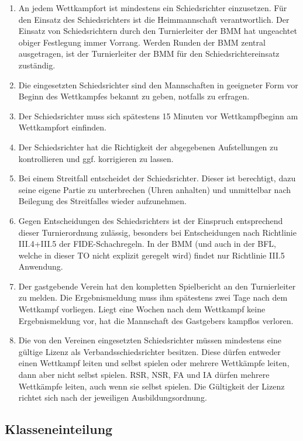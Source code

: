 \documentclass[fontsize=12pt, paper=a4, ngerman]{article}
\begin{document}
\begin{enumerate}
\item An jedem Wettkampfort ist mindestens ein Schiedsrichter einzusetzen. Für den Einsatz des Schiedsrichters ist die Heimmannschaft verantwortlich.
Der Einsatz von Schiedsrichtern durch den Turnierleiter der BMM hat ungeachtet obiger Festlegung immer Vorrang. Werden Runden der BMM zentral ausgetragen,
ist der Turnierleiter der BMM für den Schiedsrichtereinsatz zuständig.
\item Die eingesetzten Schiedsrichter sind den Mannschaften in geeigneter Form vor Beginn des Wettkampfes bekannt zu geben, notfalls zu erfragen.
\item Der Schiedsrichter muss sich spätestens 15 Minuten vor Wettkampfbeginn am Wettkampfort einfinden.
\item Der Schiedsrichter hat die Richtigkeit der abgegebenen Aufstellungen zu kontrollieren und ggf. korrigieren zu lassen.
\item Bei einem Streitfall entscheidet der Schiedsrichter. Dieser ist berechtigt, dazu seine eigene Partie zu unterbrechen (Uhren anhalten) und unmittelbar nach
Beilegung des Streitfalles wieder aufzunehmen.
\item Gegen Entscheidungen des Schiedsrichters ist der Einspruch entsprechend dieser Turnierordnung zulässig, besonders bei Entscheidungen nach Richtlinie III.4+III.5
der FIDE-Schachregeln. In der BMM (und auch in der BFL, welche in dieser TO nicht explizit geregelt wird) findet nur Richtlinie III.5 Anwendung.
\item Der gastgebende Verein hat den kompletten Spielbericht an den Turnierleiter zu melden. Die Ergebnismeldung muss ihm spätestens zwei Tage nach dem Wettkampf vorliegen.
Liegt eine Wochen nach dem Wettkampf keine Ergebnismeldung vor, hat die Mannschaft des Gastgebers kampflos verloren.
\item Die von den Vereinen eingesetzten Schiedsrichter müssen mindestens eine gültige Lizenz als Verbandsschiedsrichter besitzen. Diese dürfen entweder einen Wettkampf leiten und
selbst spielen oder mehrere Wettkämpfe leiten, dann aber nicht selbst spielen. RSR, NSR, FA und IA dürfen mehrere Wettkämpfe leiten, auch wenn sie selbst spielen.
Die Gültigkeit der Lizenz richtet sich nach der jeweiligen Ausbildungsordnung.
\end{enumerate}

\subsection{Klasseneinteilung}
\end{document}
